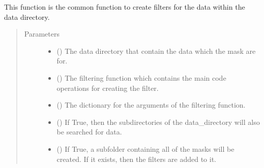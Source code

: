 \documentclass[letterpaper,10pt,english]{sphinxmanual}
\begin{document}
\begin{fulllineitems}
\label{\detokenize{docstrings/ifa_smeargle.masking.base_functions:ifa_smeargle.masking.base_functions.create_directory_filter_files}}
This function is the common function to create filters
for the data within the data directory.
\begin{quote}\begin{description}
\item[{Parameters}] \leavevmode\begin{itemize}
\item {} 
 () \textendash{} The data directory that contain the data which the mask are
for.

\item {} 
 () \textendash{} The filtering function which contains the main code
operations for creating the filter.

\item {} 
 () \textendash{} The dictionary for the arguments of the filtering function.

\item {} 
 (\sphinxstyleliteralemphasis{\sphinxupquote{ (}}\sphinxstyleliteralemphasis{\sphinxupquote{)}}) \textendash{} If True, then the subdirectories of the data\_directory will
also be searched for data.

\item {} 
 (\sphinxstyleliteralemphasis{\sphinxupquote{ (}}\sphinxstyleliteralemphasis{\sphinxupquote{)}}) \textendash{} If True, a sub\sphinxhyphen{}folder containing all of the masks will be
created. If it exists, then the filters are added to it.


\end{itemize}
\end{description}
\end{quote}
\end{fulllineitems}
\end{document}
